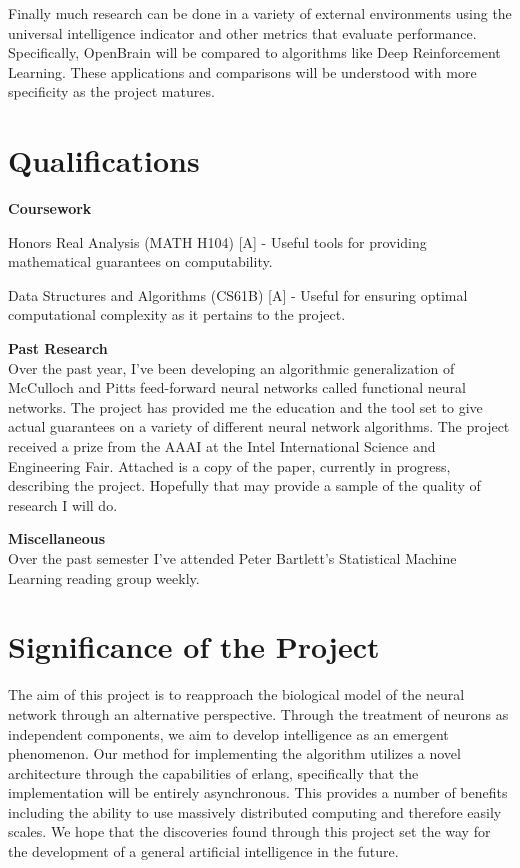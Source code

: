 \documentclass[letter]{article}
\newenvironment{menumerate}{%
  \edef\backupindent{\the\parindent}%
  \enumerate%
  \setlength{\parindent}{\backupindent}%
}{\endenumerate}
\begin{document}
Finally much research can be done in a variety of external environments using the universal intelligence indicator
and other metrics that evaluate performance. Specifically, OpenBrain will be compared to algorithms like Deep Reinforcement Learning.
These applications and comparisons will be understood with more specificity as the project matures.

\section{Qualifications}
\textbf{Coursework}
\begin{menumerate}
\item Honors Real Analysis (MATH H104) [A] - Useful tools for providing mathematical guarantees on computability.
\item Data Structures and Algorithms (CS61B) [A] - Useful for ensuring optimal computational complexity as it pertains to the project.
\end{menumerate}


\textbf{Past Research} \\
Over the past year, I've been developing an algorithmic generalization of McCulloch and Pitts feed-forward neural networks
called functional neural networks. The project has provided me the education and the tool set to give actual guarantees on
a variety of different neural network algorithms. The project received a prize from the AAAI at the Intel International Science and Engineering Fair.
Attached is a copy of the paper, currently in progress, describing the project. Hopefully that may provide a sample of the quality
of research I will do.

\textbf{Miscellaneous} \\
Over the past semester I've attended Peter Bartlett's Statistical Machine Learning reading group weekly.

\section{Significance of the Project}
The aim of this project is to reapproach the biological model of the neural network through an alternative perspective. Through the treatment of
neurons as independent components, we aim to develop intelligence as an emergent phenomenon. Our method for implementing the algorithm utilizes
a novel architecture through the capabilities of erlang, specifically that the implementation will be entirely asynchronous. This provides
a number of benefits including the ability to use massively distributed computing and therefore easily scales. We hope that the discoveries found
through this project set the way for the development of a general artificial intelligence in the future.
\end{document}
